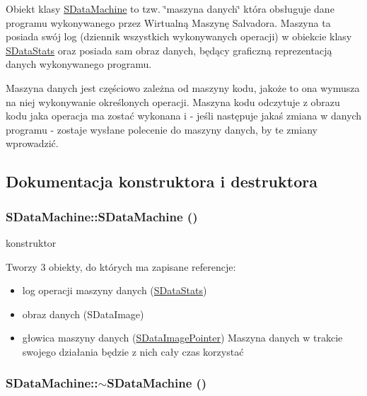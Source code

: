 Obiekt klasy \hyperlink{classSDataMachine}{SDataMachine} to tzw. \char`\"{}maszyna danych\char`\"{} która obsługuje dane programu wykonywanego przez Wirtualną Maszynę Salvadora. Maszyna ta posiada swój log (dziennik wszystkich wykonywanych operacji) w obiekcie klasy \hyperlink{classSDataStats}{SDataStats} oraz posiada sam obraz danych, będący graficzną reprezentacją danych wykonywanego programu.

Maszyna danych jest częściowo zależna od maszyny kodu, jakoże to ona wymusza na niej wykonywanie określonych operacji. Maszyna kodu odczytuje z obrazu kodu jaka operacja ma zostać wykonana i - jeśli następuje jakaś zmiana w danych programu - zostaje wysłane polecenie do maszyny danych, by te zmiany wprowadzić. 

\subsection{Dokumentacja konstruktora i destruktora}
\hypertarget{classSDataMachine_3d894df00bd2283c717a827e27138812}{
\subsubsection{\setlength{\rightskip}{0pt plus 5cm}SDataMachine::SDataMachine ()}}
\label{classSDataMachine_3d894df00bd2283c717a827e27138812}


konstruktor 

Tworzy 3 obiekty, do których ma zapisane referencje:\begin{itemize}
\item log operacji maszyny danych (\hyperlink{classSDataStats}{SDataStats})\item obraz danych (SDataImage)\item głowica maszyny danych (\hyperlink{classSDataImagePointer}{SDataImagePointer}) Maszyna danych w trakcie swojego działania będzie z nich cały czas korzystać \end{itemize}
\hypertarget{classSDataMachine_59bc85b25930729cbe3046e81f49f909}{
\subsubsection{\setlength{\rightskip}{0pt plus 5cm}SDataMachine::$\sim$SDataMachine ()}}
\label{classSDataMachine_59bc85b25930729cbe3046e81f49f909}


